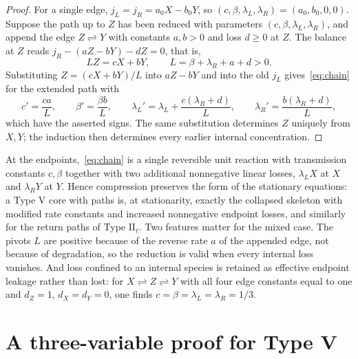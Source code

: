 \documentclass[11pt,a4paper]{article}
\theoremstyle{plain}
\theoremstyle{definition}
\theoremstyle{remark}
\numberwithin{equation}{section}
\newcommand{\II}{\mathrm{II}}
\newcommand{\V}{\mathrm{V}}
\begin{document}
\begin{proof}
For a single edge, $j_L=j_R=a_0X-b_0Y$, so $(c,\beta,\lambda_L,\lambda_R)=(a_0,b_0,0,0)$. Suppose the path up to $Z$ has been reduced with parameters $(c,\beta,\lambda_L,\lambda_R)$, and append the edge $Z\rightleftharpoons Y$ with constants $a,b>0$ and loss $d\ge0$ at $Z$. The balance at $Z$ reads $j_R-(aZ-bY)-dZ=0$, that is,
\[
LZ=cX+bY,\qquad L=\beta+\lambda_R+a+d>0 .
\]
Substituting $Z=(cX+bY)/L$ into $aZ-bY$ and into the old $j_L$ gives~\eqref{eq:chain} for the extended path with
\begin{equation}\label{eq:pathrecursion}
c'=\frac{ca}{L},\qquad \beta'=\frac{\beta b}{L},\qquad
\lambda_L'=\lambda_L+\frac{c(\lambda_R+d)}{L},\qquad
\lambda_R'=\frac{b(\lambda_R+d)}{L},
\end{equation}
which have the asserted signs. The same substitution determines $Z$ uniquely from $X,Y$; the induction then determines every earlier internal concentration.
\end{proof}

At the endpoints,~\eqref{eq:chain} is a single reversible unit reaction with transmission constants $c,\beta$ together with two additional nonnegative linear losses, $\lambda_LX$ at $X$ and $\lambda_RY$ at $Y$. Hence compression preserves the form of the stationary equations: a Type $\V$ core with paths is, at stationarity, exactly the collapsed skeleton with modified rate constants and increased nonnegative endpoint losses, and similarly for the return paths of Type $\II_\ell$. Two features matter for the mixed case. The pivots $L$ are positive because of the reverse rate $a$ of the appended edge, not because of degradation, so the reduction is valid when every internal loss vanishes. And loss confined to an internal species is retained as effective endpoint leakage rather than lost: for $X\rightleftharpoons Z\rightleftharpoons Y$ with all four edge constants equal to one and $d_Z=1$, $d_X=d_Y=0$, one finds $c=\beta=\lambda_L=\lambda_R=1/3$.

\section{A three-variable proof for Type V}\label{sec:typev}
\end{document}
